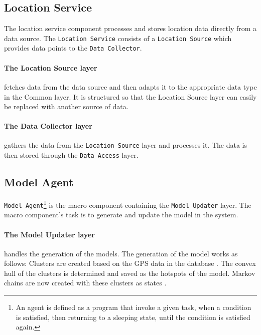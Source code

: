 \subsection{Location Service} 
The location service component processes and stores location data directly from a data source. 
The \texttt{Location Service} consists of a \texttt{Location Source} which provides data points to the \texttt{Data Collector}.

\paragraph{The Location Source layer} fetches data from the data source and then adapts it to the appropriate data type in the Common layer.
It is structured so that the Location Source layer can easily be replaced with another source of data.

\paragraph{The Data Collector layer} gathers the data from the \texttt{Location Source} layer and processes it. 
The data is then stored through the \texttt{Data Access} layer.

\subsection{Model Agent}
\texttt{Model Agent}\footnote{An agent is defined as a program that invoke a given task, when a condition is satisfied, then returning to a sleeping state, until the condition is satisfied again.\cite{definitionagent}} is the macro component containing the \texttt{Model Updater} layer.
The macro component's task is to generate and update the model in the system. 

\paragraph{The Model Updater layer} handles the generation of the models.
The generation of the model works as follows:
Clusters are created based on the GPS data in the database .
The convex hull of the clusters is determined and saved as the hotspots of the model.
Markov chains are now created with these clusters as states .

